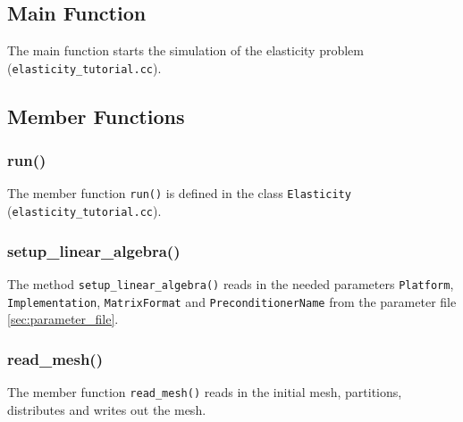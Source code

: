 \documentclass[a4paper, 11pt, twoside]{article}
\theoremstyle{plain}
\theoremstyle{definition}
\begin{document}

\subsection{Main Function}
\label{ssec:main}

The main function starts the simulation of the elasticity problem (\verb'elasticity_tutorial.cc').





\subsection{Member Functions}
\label{ssec:Member_Functions}

\subsubsection{run()}
\label{sssec:run}

The member function \verb'run()' is defined in the class \verb'Elasticity' (\verb'elasticity_tutorial.cc').







\subsubsection{setup\_linear\_algebra()}

The method \verb'setup_linear_algebra()' reads in the needed parameters \verb'Platform', \verb'Implementation', \verb'MatrixFormat' and \verb'PreconditionerName' from the parameter file \ref{sec:parameter_file}.





\subsubsection{read\_mesh()}
\label{sssec:read_mesh}

The member function \verb'read_mesh()' reads in the initial mesh, partitions, distributes and writes out the mesh.


\end{document}
